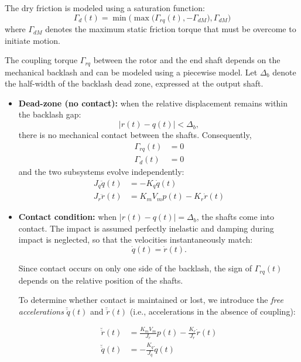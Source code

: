 \documentclass[english,12pt,a4paper]{article}
\begin{document}
		The dry friction is modeled using a saturation function:
		\begin{equation}
			\Gamma_d(t) = \min\big(\max\big(\Gamma_{rq}(t), -\Gamma_{dM}\big), \Gamma_{dM}\big)
		\end{equation}
		where $\Gamma_{dM}$ denotes the maximum static friction torque that must be overcome to initiate motion.
		
		The coupling torque $\Gamma_{rq}$ between the rotor and the end shaft depends on the mechanical backlash and can be modeled using a piecewise model. Let $\Delta_b$ denote the half-width of the backlash dead zone, expressed at the output shaft.
		\begin{itemize}
			\item \textbf{Dead-zone (no contact):} when the relative displacement remains within the backlash gap:
			\begin{equation}
				\big|r(t)-q(t)\big| < \Delta_b,
			\end{equation}	
			there is no mechanical contact between the shafts. Consequently,
			\begin{align}
				\Gamma_{rq}(t) &= 0 \\
				\Gamma_d(t) &= 0
			\end{align}
			and the two subsystems evolve independently:
			\begin{align}
				J_q \ddot{q}(t) &= - K_q \dot{q}(t) \\
				J_r \ddot{r}(t) &= K_m V_m p(t) - K_r \dot{r}(t)
			\end{align}
			
			\item \textbf{Contact condition:} when $\big|r(t)-q(t)\big| = \Delta_b$, the shafts come into contact. The impact is assumed perfectly inelastic and damping during impact is neglected, so that the velocities instantaneously match:
			\begin{equation}
				\dot{q}(t) = \dot{r}(t).
			\end{equation}
						
			Since contact occurs on only one side of the backlash, the sign of $\Gamma_{rq}(t)$ depends on the relative position of the shafts.
			
			To determine whether contact is maintained or lost, we introduce the \emph{free accelerations} $\breve{\ddot{q}}(t)$ and $\breve{\ddot{r}}(t)$ (i.e., accelerations in the absence of coupling):
			
			\begin{align}
				\breve{\ddot{r}}(t) &= \frac{K_m V_m}{J_r} p(t) - \frac{K_r}{J_r} \dot{r}(t) \\
				\breve{\ddot{q}}(t) &= - \frac{K_q}{J_q} \dot{q}(t)
			\end{align}
			

\end{itemize}
\end{document}
